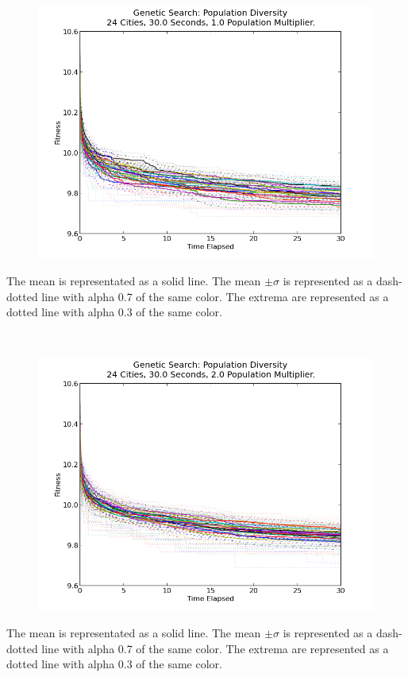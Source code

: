 \documentclass[10pt, conference, compsocconf]{IEEEtran}
\begin{document}
\newpage
$ $
\newpage
\begin{figure}[t]
  \centering
    \includegraphics[width=1\textwidth]{../Example_Output_Images/24_cities/30_seconds/populationDiversity_10_populationMuliplier.png}
\end{figure}
The mean is representated as a solid line. The mean $\pm\sigma$ is represented as a dash-dotted line with alpha 0.7 of the same color. The extrema are represented as a dotted line with alpha 0.3 of the same color.
$ $


\newpage
$ $
\newpage
\begin{figure}[t]
  \centering
    \includegraphics[width=1\textwidth]{../Example_Output_Images/24_cities/30_seconds/populationDiversity_20_populationMuliplier.png}
\end{figure}
The mean is representated as a solid line. The mean $\pm\sigma$ is represented as a dash-dotted line with alpha 0.7 of the same color. The extrema are represented as a dotted line with alpha 0.3 of the same color.
$ $
\end{document}
